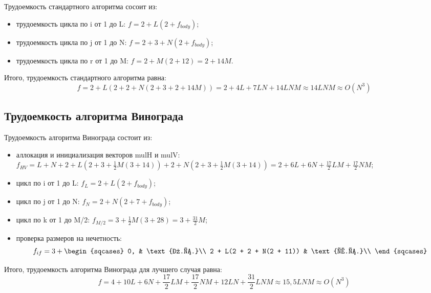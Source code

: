 Трудоемкость стандартного алгоритма сосоит из:
\begin{itemize}
	\item трудоемкость цикла по i от 1 до L: $f = 2 + L(2 + f_{body})$;
	\item трудоемкость цикла по j от 1 до N: $f = 2 + 3 + N(2 + f_{body})$;
	\item трудоемкость цикла по r от 1 до M: $f = 2 + M(2 + 12) = 2 + 14M$.
\end{itemize}

Итого, трудоемкость стандартного алгоритма равна:
\begin{equation}
    f = 2 + L(2 + 2 + N(2 + 3 + 2 + 14M)) = 2 + 4L + 7LN + 14LNM \approx 14LNM \approx O(N^3)
\end{equation}

\subsection{Трудоемкость алгоритма Винограда}

Трудоемкость алгоритма Винограда состоит из:
\begin{itemize}
    \item аллокация и инициализация векторов mulH и mulV: $f_{HV} = L + N + 2 + L(2 + 3 + \frac{1}{2}M(3 + 14)) + 2 + N(2 + 3 + \frac{1}{2}M(3 + 14)) = 2 + 6L + 6N + \frac{17}{2}LM + \frac{17}{2}NM$;
    \item цикл по i от 1 до L: $f_{L} = 2 + L(2 + f_{body})$;
    \item цикл по j от 1 до N: $f_{N} = 2 + N(2 + 7 + f_{body})$;
    \item цикл по k от 1 до M/2: $f_{M/2} = 3 + \frac{1}{2}M(3 + 28) = 3 + \frac{31}{2}M$;
    \item проверка размеров на нечетность:
    \begin{equation}
    	f_{if} = 3 + \begin{sqcases}
    			0, & \text{л.с.}\\
    			2 + L(2 + 2 + N(2 + 11)) & \text{х.с.}\\
    		\end{sqcases}
    \end{equation}
\end{itemize}

\newpage
Итого, трудоемкость алгоритма Винограда для лучшего случая равна:
\begin{equation}
	f = 4 + 10L + 6N + \frac{17}{2}LM + \frac{17}{2}NM + 12LN + \frac{31}{2}LNM \approx 15,5LNM \approx O(N^3)
\end{equation}

